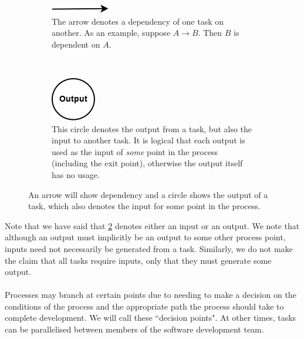 \begin{figure}[h!]
\centering
\begin{subfigure}[b]{.45\textwidth}
\centering
\includegraphics[scale=0.6]{media/Dependency}
\caption{The arrow denotes a dependency of one task on another. As an example, suppose $A \to B$.
	Then $B$ is dependent on $A$.}
\label{depFigure}
\end{subfigure}
~
\begin{subfigure}[b]{.45\textwidth}
\centering
\includegraphics[scale=0.6]{media/Output}
\caption{This circle denotes the output from a task, but also the input to another task. It
is logical that each output is used as the input of {\em some} point in the process (including the
		exit point), otherwise the output itself has no usage.}
\label{outputFigure}
\end{subfigure}
\caption{An arrow will show dependency and a circle shows the output of a task,
which also denotes the input for some point in the process.} \label{depOutFigure}
\end{figure}

Note that we have said that \ref{outputFigure} denotes either an input or an
output.
We note that although an output must implicitly be an output to some other
process point, inputs need not necessarily be generated from a task.
Similarly, we do not make the claim that all tasks require inputs, only that
they must generate some output.\\
\\
Processes may branch at certain points due to needing to make a decision on the conditions of the
process and the appropriate path the process should take to complete development.
We will call these ``decision points".
At other times, tasks can be parallelised between members of the software development team.

